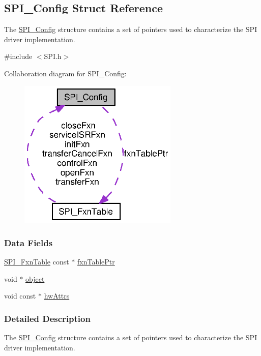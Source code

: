 \subsection{S\-P\-I\-\_\-\-Config Struct Reference}
\label{struct_s_p_i___config}


The \hyperlink{struct_s_p_i___config}{S\-P\-I\-\_\-\-Config} structure contains a set of pointers used to characterize the S\-P\-I driver implementation.  




{\ttfamily \#include $<$S\-P\-I.\-h$>$}



Collaboration diagram for S\-P\-I\-\_\-\-Config\-:
\nopagebreak
\begin{figure}[H]
\begin{center}
\leavevmode
\includegraphics[width=215pt]{struct_s_p_i___config__coll__graph}
\end{center}
\end{figure}
\subsubsection*{Data Fields}
\begin{DoxyCompactItemize}
\item 
\hyperlink{struct_s_p_i___fxn_table}{S\-P\-I\-\_\-\-Fxn\-Table} const $\ast$ \hyperlink{struct_s_p_i___config_a099238ad6e5c2ca2d38f041624362636}{fxn\-Table\-Ptr}
\item 
void $\ast$ \hyperlink{struct_s_p_i___config_a35884e199911642a791e9a422dfccba6}{object}
\item 
void const $\ast$ \hyperlink{struct_s_p_i___config_a4c8bfac4e9152b4e1da78f4926ecd4db}{hw\-Attrs}
\end{DoxyCompactItemize}


\subsubsection{Detailed Description}
The \hyperlink{struct_s_p_i___config}{S\-P\-I\-\_\-\-Config} structure contains a set of pointers used to characterize the S\-P\-I driver implementation. 

